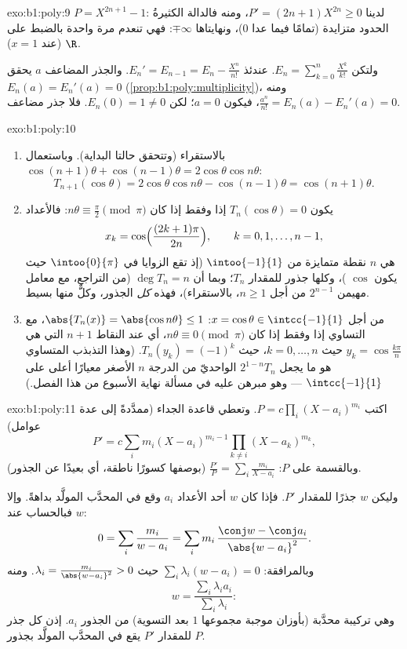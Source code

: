 \begin{solution}{exo:b1:poly:9}
$P = X^{2n+1} - 1$: لدينا $P' = (2n+1)X^{2n} \geq 0$، ومنه فالدالة
الكثيرةُ الحدود متزايدة (تمامًا فيما عدا $0$)، ونهايتاها
$\mp\infty$: فهي تنعدم مرة واحدة بالضبط على $\R$ (عند $x = 1$).

ولتكن $E_n = \sum_{k=0}^{n} \frac{X^k}{k!}$. عندئذ $E_n' = E_{n-1} = E_n
- \frac{X^n}{n!}$. والجذر المضاعف $a$ يحقق $E_n(a) =
E_n'(a) = 0$ (\cref{prop:b1:poly:multiplicity})، ومنه
$\frac{a^n}{n!} = E_n(a) - E_n'(a) = 0$، فيكون $a = 0$؛ لكن $E_n(0) = 1
\neq 0$. فلا جذر مضاعف.
\end{solution}

\begin{solution}{exo:b1:poly:10}
\begin{enumerate}
  \item بالاستقراء (وتتحقق حالتا البداية). وباستعمال $\cos(n+1)\theta +
        \cos(n-1)\theta = 2\cos\theta\cos n\theta$:
        \[
        T_{n+1}(\cos\theta) = 2\cos\theta \cos n\theta -
        \cos(n-1)\theta = \cos(n+1)\theta .
        \]
  \item يكون $T_n(\cos\theta) = 0$ إذا وفقط إذا كان $n\theta \equiv \frac\pi2 \pmod
        \pi$: فالأعداد
        \[
        x_k = \cos\Bigl(\frac{(2k+1)\pi}{2n}\Bigr),
        \qquad k = 0, 1, \dots, n-1,
        \]
        هي $n$ نقطة متمايزة من $\intoo{-1}{1}$ (إذ تقع الزوايا في
        $\intoo{0}{\pi}$ حيث يكون $\cos$ )، وكلها جذور
        للمقدار $T_n$؛ وبما أن $\deg T_n = n$ (من التراجع، مع
        معامل مهيمن $2^{n-1}$ من أجل $n \geq 1$، بالاستقراء)،
        فهذه \emph{كل} الجذور، وكلٌّ منها بسيط.
  \item من أجل $x = \cos\theta \in \intcc{-1}{1}$: $\abs{T_n(x)} =
        \abs{\cos n\theta} \leq 1$، مع التساوي إذا وفقط إذا كان $n\theta \equiv
        0 \pmod\pi$، أي عند النقاط $n+1$ التي هي $y_k =
        \cos\frac{k\pi}{n}$ حيث $k = 0, \dots, n$، حيث $T_n(y_k) =
        (-1)^k$. (وهذا التذبذب المتساوي هو ما يجعل $2^{1-n}T_n$ 
        الواحديّ من الدرجة $n$ الأصغر معيارًا أعلى على
        $\intcc{-1}{1}$ --- وهو مبرهن عليه في مسألة نهاية الأسبوع
        من هذا الفصل.)
\end{enumerate}
\end{solution}

\begin{solution}{exo:b1:poly:11}
اكتب $P = c\prod_i (X - a_i)^{m_i}$. وتعطي قاعدة الجداء (ممدَّدةً إلى
عدة عوامل)
\[
P' = c\sum_{i} m_i (X - a_i)^{m_i - 1} \prod_{k \neq i} (X -
a_k)^{m_k},
\]
وبالقسمة على $P$: $\frac{P'}{P} = \sum_i \frac{m_i}{X - a_i}$
(بوصفها كسورًا ناطقة، أي بعيدًا عن الجذور).

وليكن $w$ جذرًا للمقدار $P'$. فإذا كان $w$ أحد الأعداد $a_i$ وقع في
المحدَّب المولَّد بداهةً. وإلا فبالحساب عند $w$:
\[
0 = \sum_i \frac{m_i}{w - a_i}
= \sum_i m_i\, \frac{\conj w - \conj a_i}{\abs{w - a_i}^2} .
\]
وبالمرافقة: $\sum_i \lambda_i (w - a_i) = 0$ حيث $\lambda_i =
\frac{m_i}{\abs{w - a_i}^2} > 0$. ومنه
\[
w = \frac{\sum_i \lambda_i a_i}{\sum_i \lambda_i} :
\]
وهي تركيبة محدَّبة (بأوزان موجبة مجموعها $1$ بعد
التسوية) من الجذور $a_i$. إذن كل جذر للمقدار $P'$ يقع في
المحدَّب المولَّد بجذور $P$.
\end{solution}

